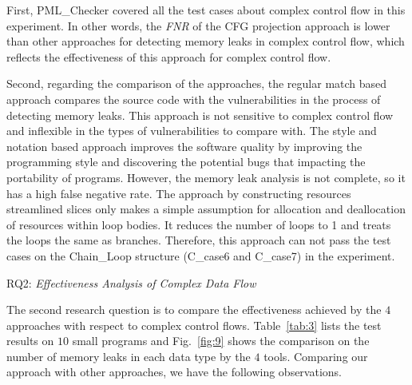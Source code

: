 
First, PML\_Checker covered all the test cases about complex control flow in this experiment. In other words, the \textit{FNR} of the CFG projection approach is lower than other approaches for detecting memory leaks in complex control flow, which reflects the effectiveness of this approach for complex control flow.

Second, regarding the comparison of the approaches, the regular match based approach compares the source code with the vulnerabilities in the process of detecting memory leaks. This approach is not sensitive to complex control flow and inflexible in the types of vulnerabilities to compare with. The style and notation based approach improves the software quality by improving the programming style and discovering the potential bugs that impacting the portability of programs. However, the memory leak analysis is not complete, so it has a high false negative rate. The approach by constructing resources streamlined slices only makes a simple assumption for allocation and deallocation of resources within loop bodies. It reduces the number of loops to 1 and treats the loops the same as branches. Therefore, this approach can not pass the test cases on the Chain\_Loop structure (C\_case6 and C\_case7) in the experiment.

\noindent RQ2: \textit{Effectiveness Analysis of Complex Data Flow}

The second research question is to compare the effectiveness achieved by the $4$ approaches with respect to complex control flows. Table~\ref{tab:3} lists the test results on $10$ small programs and Fig.~\ref{fig:9} shows the comparison on the number of  memory leaks in each data type by the $4$ tools. Comparing our approach with other approaches, we have the following observations.

